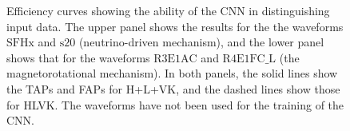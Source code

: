 \documentclass[aps,twocolumn,showpacs,groupedaddress, nofootinbib]{revtex4}  %
\begin{document}
%
% 
%
\begin{figure}
     \begin{center}
        \quad
    \end{center}
    \caption{Efficiency curves showing the ability of the \ac{CNN} in
distinguishing input data.  The upper panel shows the results for the the
waveforms $\text{SFHx}$ and $\text{s}20$ (neutrino-driven mechanism), and the
lower panel shows that for the waveforms $\text{R3E1AC}$ and $\text{R4E1FC\_L}$
(the magnetorotational mechanism).  In both panels, the solid lines show the
\acp{TAP} and \acp{FAP} for H+L+VK, and the dashed lines show those for HLVK.
The waveforms have not been used for the training of the \ac{CNN}.
\label{fig:Extratest}}
\end{figure}
\end{document}
